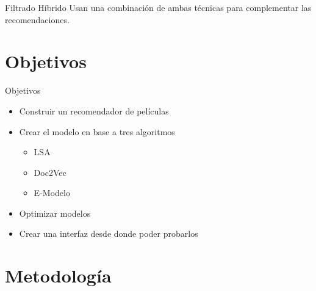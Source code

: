 \documentclass[table]{beamer}
\begin{document}
  \begin{frame}{Filtrado Híbrido}
      Usan una combinación de ambas técnicas para complementar las recomendaciones.
  \end{frame}

  \section{Objetivos}

  \begin{frame}{Objetivos}
      \begin{itemize}
          \item Construir un recomendador de películas
          \item Crear el modelo en base a tres algoritmos
              \begin{itemize}
                  \item LSA
                  \item Doc2Vec
                  \item E-Modelo
              \end{itemize}
          \item Optimizar modelos
          \item Crear una interfaz desde donde poder probarlos
      \end{itemize}
  \end{frame}

  \section{Metodología}
\end{document}
